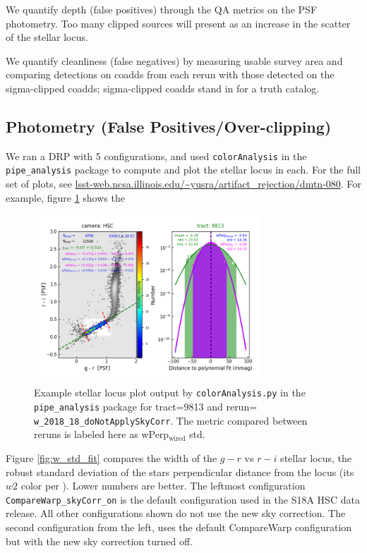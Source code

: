 \documentclass[DM,authoryear,toc]{lsstdoc}
\begin{document}
We quantify depth (false positives) through the QA metrics on the PSF photometry.
Too many clipped sources will present as an increase in the scatter of the stellar locus.

We quantify cleanliness (false negatives) by measuring usable survey area and comparing detections on coadds from each rerun with those detected on the sigma-clipped coadds; sigma-clipped coadds stand in for a truth catalog.


\subsection{Photometry (False Positives/Over-clipping)}

We ran a DRP with 5 configurations, and used \texttt{colorAnalysis} in the  \texttt{pipe\_analysis} package to compute and plot the stellar locus in each. For the full set of plots, see \url{lsst-web.ncsa.illinois.edu/~yusra/artifact_rejection/dmtn-080}.
For example, figure \ref{fig:wFit} shows the
\begin{figure}
\begin{centering}
\includegraphics[width=0.75\textwidth]{figures/plot-t9813-griPSF-wFit-fit.png}
\par\end{centering}
\caption{\label{fig:wFit}  Example stellar locus plot output by \texttt{colorAnalysis.py} in the \texttt{pipe\_analysis} package for tract=9813 and rerun= \texttt{w\_2018\_18\_doNotApplySkyCorr}. The metric compared between reruns is labeled here as wPerp$_\mathrm{wired}$ std. }
\end{figure}

Figure \ref{fig:w_std_fit} compares the width of the $g-r$ vs $r-i$ stellar locus,  the robust standard deviation of the stars perpendicular distance from the locus (its $w2$ color per \cite{Ivezic2004b}).
Lower numbers are better.
The leftmost configuration \texttt{CompareWarp\_skyCorr\_on} is the default configuration used in the S18A HSC data release.
All other configurations shown do not use the new sky correction.
The second configuration from the left, uses the default CompareWarp configuration but with the new sky correction turned off.
\end{document}
